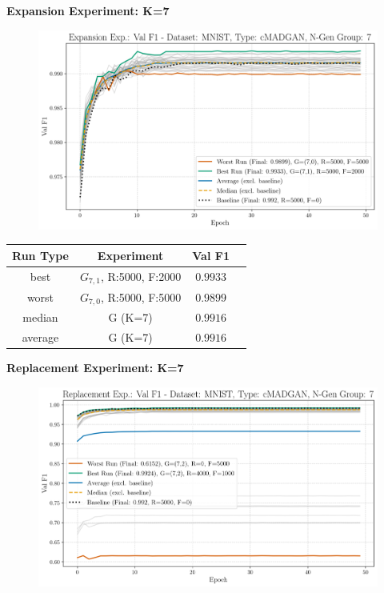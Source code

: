 \newpage
\noindent\textbf{Expansion Experiment: K=7}
\begin{figure}[htbp]
	\centering
	\includegraphics[width=.85\textwidth]{abb/strat_classifier_performance/MNIST_STRATIFIED_CLASSIFIERS_cMADGAN_NEW/expansion_experiments/val_f1_score_cMADGAN_MNIST_n_gen_7_all.png}
	\label{fig:app_strat_class_performance_expansion_exp._val_f1_score_7}
\end{figure}
\begin{table}[H]
	\vspace{-1em}
	\centering
	\begin{tabular}{|c|c|c|c|}
		\hline
		Run Type & Experiment & Val F1 \\ \hline
		best & \(G_{7, 1}\), R:5000, F:2000 & $0.9933$\\ \hline
		worst & \(G_{7, 0}\), R:5000, F:5000 & $0.9899$\\ \hline
		median & G (K=7) & $0.9916$\\ \hline
		average & G (K=7) & $0.9916$
		\\ \hline
	\end{tabular}
\end{table}
\noindent\textbf{Replacement Experiment: K=7}
\begin{figure}[htbp]
	\centering
	\includegraphics[width=.85\textwidth]{abb/strat_classifier_performance/MNIST_STRATIFIED_CLASSIFIERS_cMADGAN_NEW/replacement_experiments/val_f1_score_cMADGAN_MNIST_n_gen_7_all.png}
	\label{fig:app_strat_class_performance_replacement_exp._val_f1_score_7}
\end{figure}

